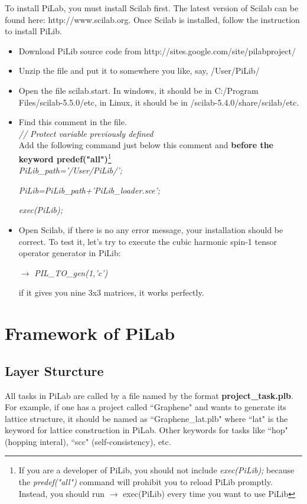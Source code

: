 \documentclass[10pt,a4paper]{article}
\begin{document}
To install PiLab, you must install Scilab first. The latest version of Scilab can be found here: http://www.scilab.org. Once Scilab is installed, follow the instruction to install PiLib.
\begin{itemize}
\item Download PiLib source code from http://sites.google.com/site/pilabproject/
\item Unzip the file and put it to somewhere you like, say, /User/PiLib/
\item Open the file scilab.start. In windows, it should be in C:/Program Files/scilab-5.5.0/etc, in Linux, it should be in /scilab-5.4.0/share/scilab/etc. 
\item Find this comment in the file. \\

\textit{// Protect variable previously defined  } \\
 
 Add the following command just below this comment and \textbf{before the keyword predef("all")}\footnote{If you are a developer of PiLib, you should not include \textit{exec(PiLib);} because the \textit{predef("all")} command will prohibit you to reload PiLib promptly. Instead, you should run $\rightarrow$ exec(PiLib) every time you want to use PiLib} \\
 
\textit{PiLib\_path='/User/PiLib/';}  

\textit{PiLib=PiLib\_path+'PiLib\_loader.sce';} 

\textit{exec(PiLib);}

\item Open Scilab, if there is no any error message, your installation should be correct. To test it, let's try to execute the cubic harmonic spin-1 tensor operator generator in PiLib:

$\rightarrow$ \textit{PIL\_TO\_gen(1,'c')}

if it gives you nine 3x3 matrices, it works perfectly.  

\end{itemize}

\section{Framework of PiLab}

\subsection{Layer Sturcture}
All tasks in PiLab are called by a file named by the format \textbf{project\_task.plb}. 
For example, if one has a project called ``Graphene" and wants to generate its lattice structure, it should be named as ``Graphene\_lat.plb" where ``lat" is the keyword for lattice construction in PiLab. Other keywords for tasks like ``hop" (hopping interal), ``scc" (self-consistency), etc. 
\end{document}
